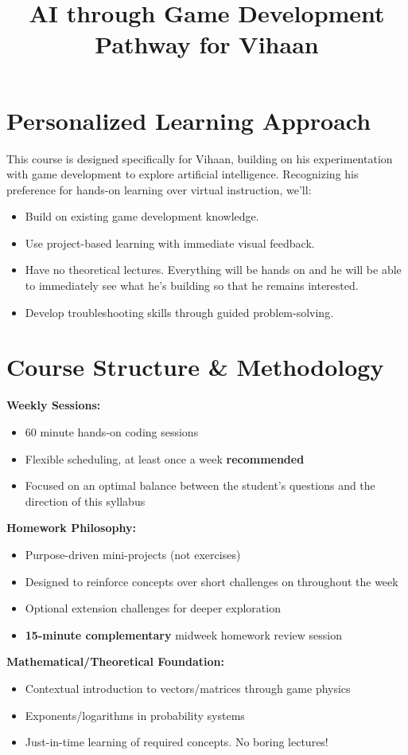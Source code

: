 \documentclass{article}
\title{\vspace{-3em}AI through Game Development Pathway for Vihaan\vspace{-3em}}
\author{}
\begin{document}
\fontsize{14}{16}\selectfont
\maketitle

\section{Personalized Learning Approach}
This course is designed specifically for Vihaan, building on his experimentation with game development to explore artificial intelligence. Recognizing his preference for hands-on learning over virtual instruction, we'll:

\begin{itemize}[leftmargin=*, noitemsep]
    \item Build on existing game development knowledge.
    \item Use project-based learning with immediate visual feedback.
    \item Have no theoretical lectures. Everything will be hands on and he will be able to immediately see what he's building so that he remains interested.
    \item Develop troubleshooting skills through guided problem-solving.
\end{itemize}

\section{Course Structure \& Methodology}
\begin{learningblock}
\textbf{Weekly Sessions:} 
\begin{itemize}[noitemsep]
\item 60 minute hands-on coding sessions 
\item Flexible scheduling, at least once a week \textbf{recommended}
\item Focused on an optimal balance between the student's questions and the direction of this syllabus
\end{itemize}

\textbf{Homework Philosophy:}
\begin{itemize}[noitemsep]
\item Purpose-driven mini-projects (not exercises)
\item Designed to reinforce concepts over short challenges on throughout the week
\item Optional extension challenges for deeper exploration
\item \textbf{15-minute complementary} midweek homework review session
\end{itemize}

\textbf{Mathematical/Theoretical Foundation:}
\begin{itemize}[noitemsep]
\item Contextual introduction to vectors/matrices through game physics
\item Exponents/logarithms in probability systems
\item Just-in-time learning of required concepts. No boring lectures!
\end{itemize}
\end{learningblock}
\end{document}
